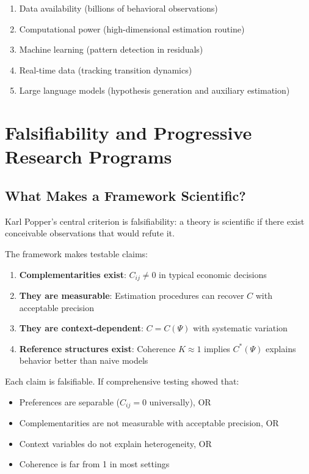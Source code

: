 \documentclass[12pt,oneside]{book}
\begin{document}
\begin{enumerate}
  \item Data availability (billions of behavioral observations)
  \item Computational power (high-dimensional estimation routine)
  \item Machine learning (pattern detection in residuals)
  \item Real-time data (tracking transition dynamics)
  \item Large language models (hypothesis generation and auxiliary estimation)
\end{enumerate}

\chapter{Falsifiability and Progressive Research Programs}
\label{sec:falsifiability}

\section{What Makes a Framework Scientific?}

Karl Popper's central criterion is falsifiability: a theory is scientific if there exist conceivable
observations that would refute it.

The framework makes testable claims:

\begin{enumerate}
  \item \textbf{Complementarities exist}: $C_{ij} \neq 0$ in typical economic decisions
  \item \textbf{They are measurable}: Estimation procedures can recover $C$ with acceptable precision
  \item \textbf{They are context-dependent}: $C = C(\Psi)$ with systematic variation
  \item \textbf{Reference structures exist}: Coherence $K \approx 1$ implies $C^*(\Psi)$ explains
        behavior better than naive models
\end{enumerate}

Each claim is falsifiable. If comprehensive testing showed that:
\begin{itemize}
  \item Preferences are separable ($C_{ij} = 0$ universally), OR
  \item Complementarities are not measurable with acceptable precision, OR
  \item Context variables do not explain heterogeneity, OR
  \item Coherence is far from 1 in most settings
\end{itemize}
\end{document}
